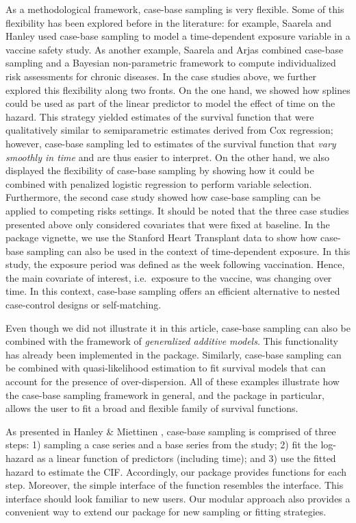 As a methodological framework, case-base sampling is very flexible. Some
of this flexibility has been explored before in the literature: for
example, Saarela and Hanley \citeyearpar{saarela2015case} used case-base
sampling to model a time-dependent exposure variable in a vaccine safety
study. As another example, Saarela and Arjas
\citeyearpar{saarela2015non} combined case-base sampling and a Bayesian
non-parametric framework to compute individualized risk assessments for
chronic diseases. In the case studies above, we further explored this
flexibility along two fronts. On the one hand, we showed how splines
could be used as part of the linear predictor to model the effect of
time on the hazard. This strategy yielded estimates of the survival
function that were qualitatively similar to semiparametric estimates
derived from Cox regression; however, case-base sampling led to
estimates of the survival function that \emph{vary smoothly in time} and
are thus easier to interpret. On the other hand, we also displayed the
flexibility of case-base sampling by showing how it could be combined
with penalized logistic regression to perform variable selection.
Furthermore, the second case study showed how case-base sampling can be
applied to competing risks settings. It should be noted that the three
case studies presented above only considered covariates that were fixed
at baseline. In the package vignette, we use the Stanford Heart
Transplant data \citep[\citet{crowley1977covariance}]{clark1971cardiac}
to show how case-base sampling can also be used in the context of
time-dependent exposure. In this study, the exposure period was defined
as the week following vaccination. Hence, the main covariate of
interest, i.e.~exposure to the vaccine, was changing over time. In this
context, case-base sampling offers an efficient alternative to nested
case-control designs or self-matching.

Even though we did not illustrate it in this article, case-base sampling
can also be combined with the framework of \emph{generalized additive
models}. This functionality has already been implemented in the package.
Similarly, case-base sampling can be combined with quasi-likelihood
estimation to fit survival models that can account for the presence of
over-dispersion. All of these examples illustrate how the case-base
sampling framework in general, and the package  in
particular, allows the user to fit a broad and flexible family of
survival functions.

As presented in Hanley \& Miettinen \citeyearpar{hanley2009fitting},
case-base sampling is comprised of three steps: 1) sampling a case
series and a base series from the study; 2) fit the log-hazard as a
linear function of predictors (including time); and 3) use the fitted
hazard to estimate the CIF. Accordingly, our package provides functions
for each step. Moreover, the simple interface of the
 function resembles the  interface.
This interface should look familiar to new users. Our modular approach
also provides a convenient way to extend our package for new sampling or
fitting strategies.

